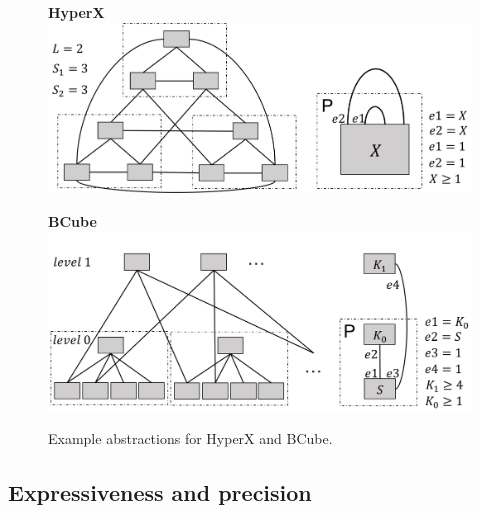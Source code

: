 \documentclass[numbers, 10pt, preprint]{sigplanconf}
\newcommand{\hdr}[2]{\flushleft \chdr{\hspace{5mm}#1}{#2}}
\newcommand{\chdr}[2]{\textbf{#1} {#2} \\ \centering}%
\begin{document}
\begin{figure}[t!]
  \begin{minipage}[t]{\linewidth}
    \hdr{HyperX}{}
    \vspace{.6em}
    \includegraphics[width=\linewidth]{figures/hyperx}
  \end{minipage}%

  \vspace{1.4em}
  \begin{minipage}[t]{\linewidth}
    \hdr{BCube}{}
    \vspace{.3em}
    \includegraphics[width=\linewidth]{figures/bcube}
  \end{minipage}%


  \caption{Example abstractions for HyperX and BCube.}
  \vspace*{-1em}%
  \label{fig:example-abstractions}
\end{figure}


\subsection{Expressiveness and precision}
\end{document}
